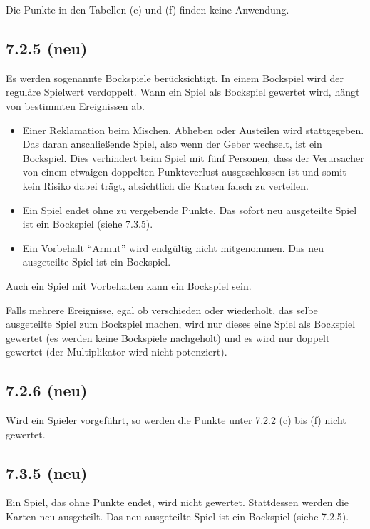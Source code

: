 Die Punkte in den Tabellen (e) und (f) finden keine Anwendung.

\subsection*{7.2.5 (neu)}

Es werden sogenannte Bockspiele berücksichtigt. In einem Bockspiel wird
der reguläre Spielwert verdoppelt. Wann ein Spiel als Bockspiel
gewertet wird, hängt von bestimmten Ereignissen ab.

\begin{itemize}
	\item Einer Reklamation beim Mischen, Abheben oder Austeilen wird
		stattgegeben. Das daran anschließende Spiel, also wenn der Geber
		wechselt, ist ein Bockspiel. Dies verhindert beim Spiel mit fünf
		Personen, dass der Verursacher von einem etwaigen doppelten
		Punkteverlust ausgeschlossen ist und somit kein Risiko dabei
		trägt, absichtlich die Karten falsch zu verteilen.
	\item Ein Spiel endet ohne zu vergebende Punkte. Das sofort neu
		ausgeteilte Spiel ist ein Bockspiel (siehe 7.3.5).
	\item Ein Vorbehalt ``Armut'' wird endgültig nicht mitgenommen. Das
		neu ausgeteilte Spiel ist ein Bockspiel.
\end{itemize}

Auch ein Spiel mit Vorbehalten kann ein Bockspiel sein.

Falls mehrere Ereignisse, egal ob verschieden oder wiederholt, das selbe
ausgeteilte Spiel zum Bockspiel machen, wird nur dieses eine Spiel als
Bockspiel gewertet (es werden keine Bockspiele nachgeholt) und es wird
nur doppelt gewertet (der Multiplikator wird nicht potenziert).

\subsection*{7.2.6 (neu)}

Wird ein Spieler vorgeführt, so werden die Punkte unter 7.2.2 (c) bis
(f) nicht gewertet.

\subsection*{7.3.5 (neu)}

Ein Spiel, das ohne Punkte endet, wird nicht gewertet. Stattdessen
werden die Karten neu ausgeteilt. Das neu ausgeteilte Spiel ist ein
Bockspiel (siehe 7.2.5).

